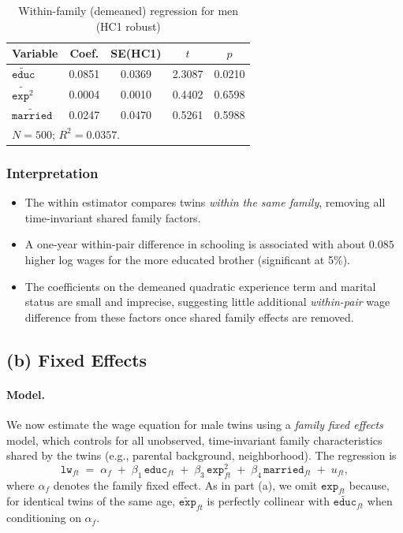 \documentclass[12pt]{article}
\begin{document}
\begin{table}[htbp]
  \centering
  \caption{Within-family (demeaned) regression for men (HC1 robust)}
  \label{tab:q4a_within_men}
  \small
  \begin{tabular}{l
                  S[table-format=1.4]
                  S[table-format=1.4]
                  S[table-format=2.4]
                  S[table-format=1.4]}
    \toprule
    Variable & {Coef.} & {SE(HC1)} & {$t$} & {$p$} \\
    \midrule
    $\tilde{\texttt{educ}}$         & 0.0851 & 0.0369 &  2.3087 & 0.0210 \\
    $\widetilde{\texttt{exp}^2}$    & 0.0004 & 0.0010 &  0.4402 & 0.6598 \\
    $\tilde{\texttt{married}}$      & 0.0247 & 0.0470 &  0.5261 & 0.5988 \\
    \midrule
     \\
    \bottomrule
  \end{tabular}
\end{table}

\subsubsection*{Interpretation}
\begin{itemize}[leftmargin=1.25em]
  \item The within estimator compares twins \emph{within the same family}, removing all time-invariant shared family factors.  
  \item A one-year within-pair difference in schooling is associated with about \(0.085\) higher log wages for the more educated brother (significant at 5\%).  
  \item The coefficients on the demeaned quadratic experience term and marital status are small and imprecise, suggesting little additional \emph{within-pair} wage difference from these factors once shared family effects are removed.  
\end{itemize} 


\subsection*{(b) Fixed Effects}

\paragraph{Model.}
We now estimate the wage equation for male twins using a \emph{family fixed effects} model, which controls for all unobserved, time-invariant family characteristics shared by the twins (e.g., parental background, neighborhood). The regression is
\[
  \texttt{lw}_{ft} \;=\; \alpha_f \;+\; \beta_1\,\texttt{educ}_{ft}
  \;+\; \beta_3\,\texttt{exp}^2_{ft}
  \;+\; \beta_4\,\texttt{married}_{ft} \;+\; u_{ft},
\]
where $\alpha_f$ denotes the family fixed effect. As in part (a), we omit $\texttt{exp}_{ft}$ because, for identical twins of the same age, $\widetilde{\texttt{exp}}_{ft}$ is perfectly collinear with $\widetilde{\texttt{educ}}_{ft}$ when conditioning on $\alpha_f$.
\end{document}
